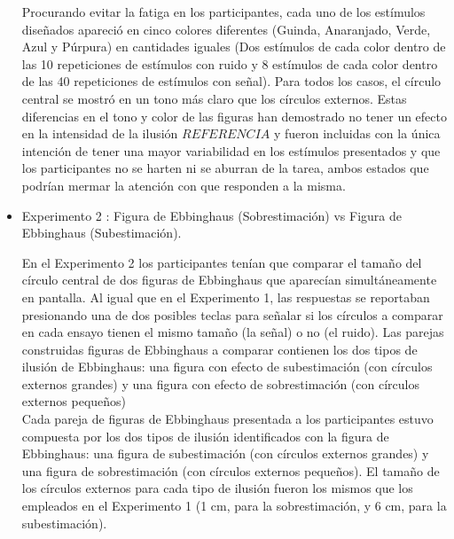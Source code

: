 \begin{itemize}
Procurando evitar la fatiga en los participantes, cada uno de los estímulos diseñados apareció en cinco colores diferentes (Guinda, Anaranjado, Verde, Azul y Púrpura) en cantidades iguales (Dos estímulos de cada color dentro de las 10 repeticiones de estímulos con ruido y 8 estímulos de cada color dentro de las 40 repeticiones de estímulos con señal). Para todos los casos, el círculo central se mostró en un tono más claro que los círculos externos. Estas diferencias en el tono y color de las figuras han demostrado no tener un efecto en la intensidad de la ilusión $REFERENCIA$ y fueron incluidas con la única intención de tener una mayor variabilidad en los estímulos presentados y que los participantes no se harten ni se aburran de la tarea, ambos estados que podrían mermar la atención con que responden a la misma. 

\item Experimento 2 : Figura de Ebbinghaus (Sobrestimación) vs Figura de Ebbinghaus (Subestimación).

En el Experimento 2 los participantes tenían que comparar el tamaño del círculo central de dos figuras de Ebbinghaus que aparecían simultáneamente en pantalla. Al igual que en el Experimento 1, las respuestas se reportaban presionando una de dos posibles teclas para señalar si los círculos a comparar en cada ensayo tienen el mismo tamaño (la señal) o no (el ruido). Las parejas construidas  figuras de Ebbinghaus a comparar contienen los dos tipos de ilusión de Ebbinghaus: una figura con efecto de subestimación (con círculos externos grandes) y una figura con efecto de sobrestimación (con círculos externos pequeños)\\ 

Cada pareja de figuras de Ebbinghaus presentada a los participantes estuvo compuesta por los dos tipos de ilusión identificados con la figura de Ebbinghaus: una figura de subestimación (con círculos externos grandes) y una figura de sobrestimación (con círculos externos pequeños). El tamaño de los círculos externos para cada tipo de ilusión fueron los mismos que los empleados en el Experimento 1 (1 cm, para la sobrestimación, y 6 cm, para la subestimación).\\


\end{itemize}
